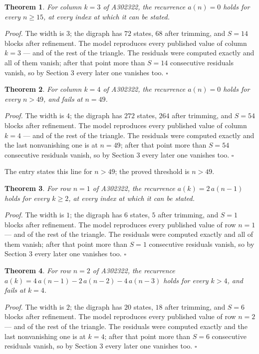 \documentclass[11pt]{article}
\newtheorem{theorem}{Theorem}
\theoremstyle{definition}
\begin{document}
\begin{theorem} For column $k = 3$ of A302322, the recurrence $a(n) = 0$ holds for every $n \ge 15$, at every index at which it can be stated.\end{theorem}

{\itshape Proof.} The width is $3$; the digraph has $72$ states, $68$ after trimming, and $S = 14$ blocks after refinement. The model reproduces every published value of column $k = 3$ --- and of the rest of the triangle. The residuals were computed exactly and all of them vanish; after that point more than $S = 14$ consecutive residuals vanish, so by Section 3 every later one vanishes too. $\square$

\begin{theorem} For column $k = 4$ of A302322, the recurrence $a(n) = 0$ holds for every $n > 49$, and fails at $n = 49$.\end{theorem}

{\itshape Proof.} The width is $4$; the digraph has $272$ states, $264$ after trimming, and $S = 54$ blocks after refinement. The model reproduces every published value of column $k = 4$ --- and of the rest of the triangle. The residuals were computed exactly and the last nonvanishing one is at $n = 49$; after that point more than $S = 54$ consecutive residuals vanish, so by Section 3 every later one vanishes too. $\square$

The entry states this line for $n > 49$; the proved threshold is $n > 49$.

\begin{theorem} For row $n = 1$ of A302322, the recurrence $a(k) = 2\,a(n-1)$ holds for every $k \ge 2$, at every index at which it can be stated.\end{theorem}

{\itshape Proof.} The width is $1$; the digraph has $6$ states, $5$ after trimming, and $S = 1$ blocks after refinement. The model reproduces every published value of row $n = 1$ --- and of the rest of the triangle. The residuals were computed exactly and all of them vanish; after that point more than $S = 1$ consecutive residuals vanish, so by Section 3 every later one vanishes too. $\square$

\begin{theorem} For row $n = 2$ of A302322, the recurrence $a(k) = 4\,a(n-1) - 2\,a(n-2) - 4\,a(n-3)$ holds for every $k > 4$, and fails at $k = 4$.\end{theorem}

{\itshape Proof.} The width is $2$; the digraph has $20$ states, $18$ after trimming, and $S = 6$ blocks after refinement. The model reproduces every published value of row $n = 2$ --- and of the rest of the triangle. The residuals were computed exactly and the last nonvanishing one is at $k = 4$; after that point more than $S = 6$ consecutive residuals vanish, so by Section 3 every later one vanishes too. $\square$
\end{document}

